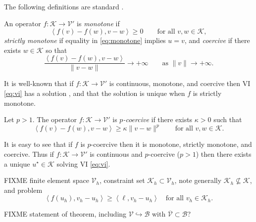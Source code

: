 \documentclass[hidelinks,onefignum,onetabnum,final]{siamart220329}  %
\newcommand{\cK}{\mathcal{K}}
\newcommand{\cV}{\mathcal{V}}
\newcommand{\ip}[2]{\left<#1,#2\right>}
\begin{document}
The following definitions are standard \cite[for example]{KinderlehrerStampacchia1980}.

\begin{definition}  An operator $f:\cK \to \cV'$ is \emph{monotone} if
\begin{equation}
\ip{f(v)-f(w)}{v-w} \ge 0 \qquad \text{for all } v,w \in \cK, \label{eq:monotone}
\end{equation}
\emph{strictly monotone} if equality in \eqref{eq:monotone} implies $u=v$, and \emph{coercive} if there exists $w \in \cK$ so that
\begin{equation}
\frac{\ip{f(v)-f(w)}{v-w}}{\|v-w\|} \to +\infty \qquad \text{as } \|v\|\to +\infty. \label{eq:coercive}
\end{equation}
\end{definition}

It is well-known that if $f:\cK \to \cV'$ is continuous, monotone, and coercive then VI \eqref{eq:vi} has a solution \cite[Corollary III.1.8]{KinderlehrerStampacchia1980}, and that the solution is unique when $f$ is strictly monotone.

\begin{definition}  Let $p>1$.  The operator $f:\cK \to \cV'$ is \emph{$p$-coercive} if there exists $\kappa>0$ such that
\begin{equation}
\ip{f(v)-f(w)}{v-w} \ge \kappa \|v-w\|^p \qquad \text{for all } v,w \in \cK. \label{eq:pcoercive}
\end{equation}
\end{definition}

It is easy to see that if $f$ is $p$-coercive then it is monotone, strictly monotone, and coercive.  Thus if $f:\cK \to \cV'$ is continuous and $p$-coercive ($p>1$) then there exists a unique $u^\star\in \cK$ solving VI \eqref{eq:vi}.

FIXME finite element space $\cV_h$, constraint set $\cK_h\subset \cV_h$, note generally $\cK_h \nsubseteq \cK$, and problem
\begin{equation}
\ip{f(u_h)}{v_h-u_h} \ge \ip{\ell}{v_h-u_h} \quad \text{for all } v_h\in \cK_h. \label{eq:fe:vi}
\end{equation}

\begin{theorem}
FIXME statement of theorem, including $\cV \hookrightarrow \mathcal{B}$ with $\overline{\cV} \subset \mathcal{B}$?
\end{theorem}
\end{document}
